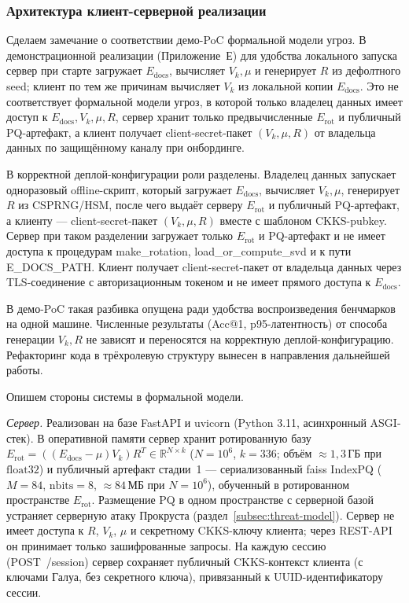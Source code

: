 \documentclass[a4paper, 12pt, oneside, openany]{article}
\begin{document}
\subsubsection{Архитектура клиент-серверной реализации}

Сделаем замечание о соответствии демо-PoC формальной модели угроз. В демонстрационной реализации (Приложение~Е) для удобства локального запуска сервер при старте загружает $E_{\mathrm{docs}}$, вычисляет $V_k, \mu$ и генерирует $R$ из дефолтного seed; клиент по тем же причинам вычисляет $V_k$ из локальной копии $E_{\mathrm{docs}}$. Это не соответствует формальной модели угроз, в которой только владелец данных имеет доступ к $E_{\mathrm{docs}}, V_k, \mu, R$, сервер хранит только предвычисленные $E_{\mathrm{rot}}$ и публичный PQ-артефакт, а клиент получает client-secret-пакет $(V_k, \mu, R)$ от владельца данных по защищённому каналу при онбординге.

В корректной деплой-конфигурации роли разделены. Владелец данных запускает одноразовый offline-скрипт, который загружает $E_{\mathrm{docs}}$, вычисляет $V_k, \mu$, генерирует $R$ из CSPRNG/HSM, после чего выдаёт серверу $E_{\mathrm{rot}}$ и публичный PQ-артефакт, а клиенту --- client-secret-пакет $(V_k, \mu, R)$ вместе с шаблоном CKKS-pubkey. Сервер при таком разделении загружает только $E_{\mathrm{rot}}$ и PQ-артефакт и не имеет доступа к процедурам make\_rotation, load\_or\_compute\_svd и к пути E\_DOCS\_PATH. Клиент получает client-secret-пакет от владельца данных через TLS-соединение с авторизационным токеном и не имеет прямого доступа к $E_{\mathrm{docs}}$.

В демо-PoC такая разбивка опущена ради удобства воспроизведения бенчмарков на одной машине. Численные результаты (Acc@1, p95-латентность) от способа генерации $V_k, R$ не зависят и переносятся на корректную деплой-конфигурацию. Рефакторинг кода в трёхролевую структуру вынесен в направления дальнейшей работы.


Опишем стороны системы в формальной модели.

\emph{Сервер.} Реализован на базе FastAPI и uvicorn (Python 3.11, асинхронный ASGI-стек). В оперативной памяти сервер хранит ротированную базу $E_{\mathrm{rot}} = ((E_{\mathrm{docs}} - \mu) V_k) R^{T} \in \mathbb{R}^{N \times k}$ ($N = 10^6$, $k = 336$; объём $\approx 1{,}3$\,ГБ при $\mathrm{float32}$) и публичный артефакт стадии~1 --- сериализованный faiss IndexPQ ($M = 84$, $\mathrm{nbits} = 8$, $\approx 84$\,МБ при $N = 10^6$), обученный в ротированном пространстве $E_{\mathrm{rot}}$. Размещение PQ в одном пространстве с серверной базой устраняет серверную атаку Прокруста (раздел~\ref{subsec:threat-model}). Сервер не имеет доступа к $R$, $V_k$, $\mu$ и секретному CKKS-ключу клиента; через REST-API он принимает только зашифрованные запросы. На каждую сессию (POST~/session) сервер сохраняет публичный CKKS-контекст клиента (с ключами Галуа, без секретного ключа), привязанный к UUID-идентификатору сессии.
\end{document}
